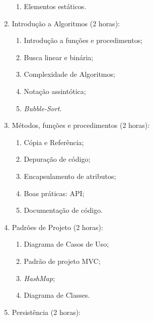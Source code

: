 \documentclass{article}
\begin{document}
\begin{enumerate}
\begin{samepage}
\begin{enumerate}
                \item Elementos estáticos.
            \end{enumerate}
        \end{samepage}
    \item Introdução a Algoritmos (2 horas):
        \begin{samepage}
            \begin{enumerate}
                \item Introdução a funções e procedimentos;
                \item Busca linear e binária;
                \item Complexidade de Algoritmos;
                \item Notação assintótica;
                \item \textit{Bubble-Sort}.
            \end{enumerate}
        \end{samepage}
    \item Métodos, funções e procedimentos (2 horas):
        \begin{samepage}
            \begin{enumerate}
                \item Cópia e Referência;
                \item Depuração de código;
                \item Encapsulamento de atributos;
                \item Boas práticas: API\@;
                \item Documentação de código.
            \end{enumerate}
        \end{samepage}
    \item Padrões de Projeto (2 horas):
        \begin{samepage}
            \begin{enumerate}
                \item Diagrama de Casos de Uso;
                \item Padrão de projeto MVC\@;
                \item \textit{HashMap};
                \item Diagrama de Classes.
            \end{enumerate}
        \end{samepage}
    \item Persistência (2 horas):
        \begin{samepage}

\end{samepage}
\end{enumerate}
\end{document}
